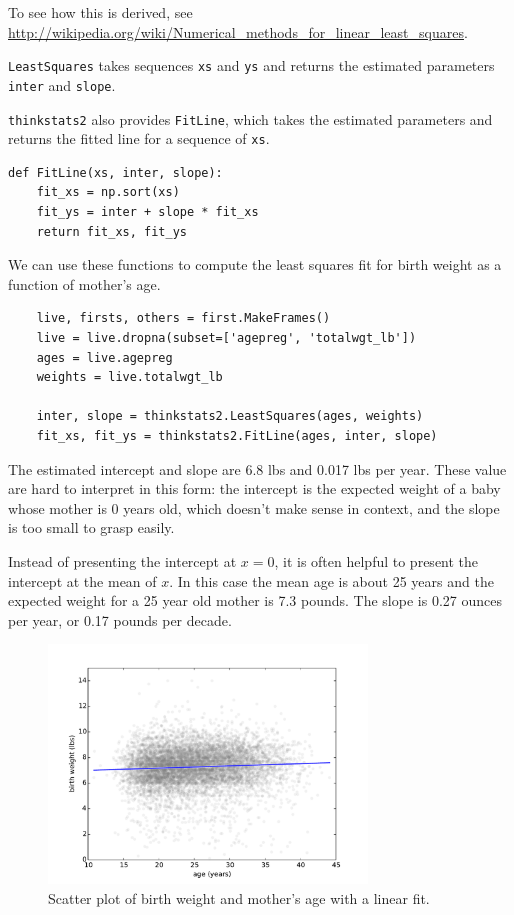 \documentclass[12pt]{book}
\begin{document}
To see how this is derived, see
\url{http://wikipedia.org/wiki/Numerical_methods_for_linear_least_squares}.

{\tt LeastSquares} takes sequences
{\tt xs} and {\tt ys} and returns the estimated parameters {\tt inter}
and {\tt slope}.

{\tt thinkstats2} also provides {\tt FitLine}, which takes the
estimated parameters and returns the fitted line for a sequence
of {\tt xs}.

\begin{verbatim}
def FitLine(xs, inter, slope):
    fit_xs = np.sort(xs)
    fit_ys = inter + slope * fit_xs
    return fit_xs, fit_ys
\end{verbatim}

We can use these functions to compute the least squares fit for
birth weight as a function of mother's age.

\begin{verbatim}
    live, firsts, others = first.MakeFrames()
    live = live.dropna(subset=['agepreg', 'totalwgt_lb'])
    ages = live.agepreg
    weights = live.totalwgt_lb

    inter, slope = thinkstats2.LeastSquares(ages, weights)
    fit_xs, fit_ys = thinkstats2.FitLine(ages, inter, slope)
\end{verbatim}

The estimated intercept and slope are 6.8 lbs and 0.017 lbs per year.
These value are hard to interpret in this form: the intercept is
the expected weight of a baby whose mother is 0 years old, which
doesn't make sense in context, and the slope is too small to
grasp easily.

Instead of presenting the intercept at $x=0$, it
is often helpful to present the intercept at the mean of $x$.  In
this case the mean age is about 25 years and the expected weight
for a 25 year old mother is 7.3 pounds.  The slope is 0.27 ounces
per year, or 0.17 pounds per decade.

\begin{figure}
\centerline{\includegraphics[height=2.5in]{figs/linear1.pdf}}
\caption{Scatter plot of birth weight and mother's age with
a linear fit.}
\label{linear1}
\end{figure}
\end{document}
